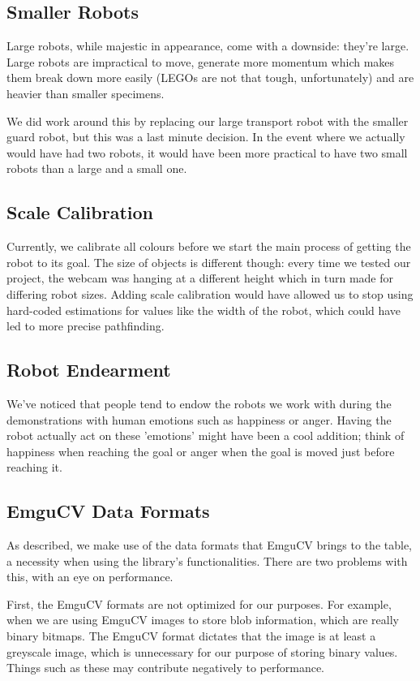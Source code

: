 \documentclass[10pt, abstracton, twocolumn]{scrartcl}
\begin{document}
\begin{appendices}
\subsection{Smaller Robots}
Large robots, while majestic in appearance, come with a downside: they're large. Large robots are impractical to move, generate more momentum which makes them break down more easily (LEGOs are not that tough, unfortunately) and are heavier than smaller specimens. 

We did work around this by replacing our large transport robot with the smaller guard robot, but this was a last minute decision. In the event where we actually would have had two robots, it would have been more practical to have two small robots than a large and a small one.

\subsection{Scale Calibration}
Currently, we calibrate all colours before we start the main process of getting the robot to its goal. The size of objects is different though: every time we tested our project, the webcam was hanging at a different height which in turn made for differing robot sizes. Adding scale calibration would have allowed us to stop using hard-coded estimations for values like the width of the robot, which could have led to more precise pathfinding.

\subsection{Robot Endearment}
We've noticed that people tend to endow the robots we work with during the demonstrations with human emotions such as happiness or anger. Having the robot actually act on these 'emotions' might have been a cool addition; think of happiness when reaching the goal or anger when the goal is moved just before reaching it.

\subsection{EmguCV Data Formats}
\label{sec:emgucvFormats}
As described, we make use of the data formats that EmguCV brings to the table, a necessity when using the library's functionalities. There are two problems with this, with an eye on performance.

First, the EmguCV formats are not optimized for our purposes. For example, when we are using EmguCV images to store blob information, which are really binary bitmaps. The EmguCV format dictates that the image is at least a greyscale image, which is unnecessary for our purpose of storing binary values. Things such as these may contribute negatively to performance.


\end{appendices}
\end{document}
